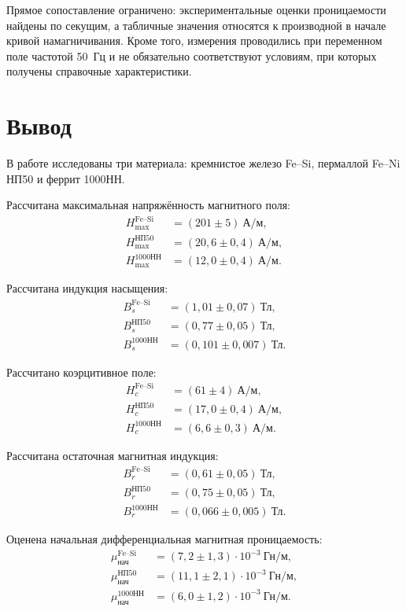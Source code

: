 \documentclass[12pt,a4paper]{article}
\begin{document}
Прямое сопоставление ограничено: экспериментальные оценки
проницаемости найдены по секущим, а табличные значения
относятся к производной в начале кривой намагничивания.
Кроме того, измерения проводились при переменном поле
частотой 50~Гц и не обязательно соответствуют условиям,
при которых получены справочные характеристики.

\clearpage
\section*{Вывод}

В работе исследованы три материала: кремнистое железо Fe--Si,
пермаллой Fe--Ni НП50 и феррит 1000НН.

Рассчитана максимальная напряжённость магнитного поля:
\[
\begin{aligned}
 H_{\max}^{\text{Fe--Si}} &=(201\pm5)\ \text{А/м},\\
 H_{\max}^{\text{НП50}} &=(20{,}6\pm0{,}4)\ \text{А/м},\\
 H_{\max}^{\text{1000НН}} &=(12{,}0\pm0{,}4)\ \text{А/м}.
\end{aligned}
\]

Рассчитана индукция насыщения:
\[
\begin{aligned}
 B_s^{\text{Fe--Si}} &=(1{,}01\pm0{,}07)\ \text{Тл},\\
 B_s^{\text{НП50}} &=(0{,}77\pm0{,}05)\ \text{Тл},\\
 B_s^{\text{1000НН}} &=(0{,}101\pm0{,}007)\ \text{Тл}.
\end{aligned}
\]

Рассчитано коэрцитивное поле:
\[
\begin{aligned}
 H_c^{\text{Fe--Si}} &=(61\pm4)\ \text{А/м},\\
 H_c^{\text{НП50}} &=(17{,}0\pm0{,}4)\ \text{А/м},\\
 H_c^{\text{1000НН}} &=(6{,}6\pm0{,}3)\ \text{А/м}.
\end{aligned}
\]

Рассчитана остаточная магнитная индукция:
\[
\begin{aligned}
 B_r^{\text{Fe--Si}} &=(0{,}61\pm0{,}05)\ \text{Тл},\\
 B_r^{\text{НП50}} &=(0{,}75\pm0{,}05)\ \text{Тл},\\
 B_r^{\text{1000НН}} &=(0{,}066\pm0{,}005)\ \text{Тл}.
\end{aligned}
\]

Оценена начальная дифференциальная магнитная проницаемость:
\[
\begin{aligned}
 \mu_{\text{нач}}^{\text{Fe--Si}} &=(7{,}2\pm1{,}3)\cdot10^{-3}\ \text{Гн/м},\\
 \mu_{\text{нач}}^{\text{НП50}} &=(11{,}1\pm2{,}1)\cdot10^{-3}\ \text{Гн/м},\\
 \mu_{\text{нач}}^{\text{1000НН}} &=(6{,}0\pm1{,}2)\cdot10^{-3}\ \text{Гн/м}.
\end{aligned}
\]
\end{document}
